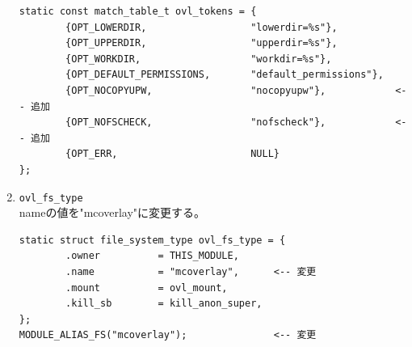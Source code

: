 \documentclass[twoside,11pt,fleqn]{book}
\begin{document}
\begin{enumerate}
\begin{verbatim}
static const match_table_t ovl_tokens = {
        {OPT_LOWERDIR,                  "lowerdir=%s"},
        {OPT_UPPERDIR,                  "upperdir=%s"},
        {OPT_WORKDIR,                   "workdir=%s"},
        {OPT_DEFAULT_PERMISSIONS,       "default_permissions"},
        {OPT_NOCOPYUPW,                 "nocopyupw"},            <-- 追加
        {OPT_NOFSCHECK,                 "nofscheck"},            <-- 追加
        {OPT_ERR,                       NULL}
};
\end{verbatim}
\normalsize

\item \texttt{ovl\_fs\_type}\\
nameの値を"mcoverlay"に変更する。
\footnotesize
\begin{verbatim}
static struct file_system_type ovl_fs_type = {
        .owner          = THIS_MODULE,
        .name           = "mcoverlay",      <-- 変更
        .mount          = ovl_mount,
        .kill_sb        = kill_anon_super,
};
MODULE_ALIAS_FS("mcoverlay");               <-- 変更
\end{verbatim}
\normalsize
\end{enumerate}

\end{document}
